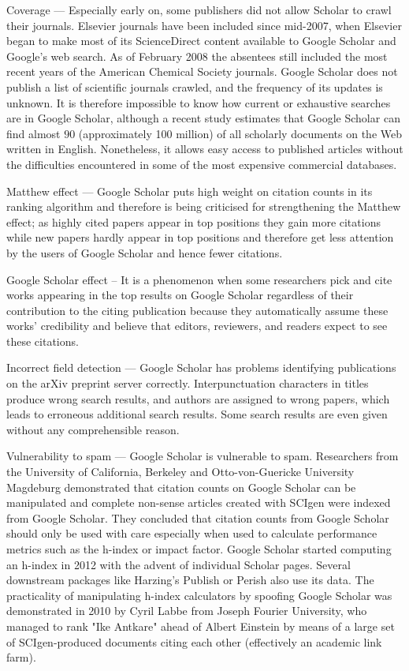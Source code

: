 \begin{enumerate}
	Coverage — Especially early on, some publishers did not allow Scholar to crawl their journals. Elsevier journals have been included since mid-2007, when Elsevier began to make most of its ScienceDirect content available to Google Scholar and Google's web search. As of February 2008 the absentees still included the most recent years of the American Chemical Society journals. Google Scholar does not publish a list of scientific journals crawled, and the frequency of its updates is unknown. It is therefore impossible to know how current or exhaustive searches are in Google Scholar, although a recent study estimates that Google Scholar can find almost $90$ (approximately 100 million) of all scholarly documents on the Web written in English. Nonetheless, it allows easy access to published articles without the difficulties encountered in some of the most expensive commercial databases.
	
	Matthew effect — Google Scholar puts high weight on citation counts in its ranking algorithm and therefore is being criticised for strengthening the Matthew effect; as highly cited papers appear in top positions they gain more citations while new papers hardly appear in top positions and therefore get less attention by the users of Google Scholar and hence fewer citations.
	
	Google Scholar effect – It is a phenomenon when some researchers pick and cite works appearing in the top results on Google Scholar regardless of their contribution to the citing publication because they automatically assume these works’ credibility and believe that editors, reviewers, and readers expect to see these citations.
	
	Incorrect field detection — Google Scholar has problems identifying publications on the arXiv preprint server correctly. Interpunctuation characters in titles produce wrong search results, and authors are assigned to wrong papers, which leads to erroneous additional search results. Some search results are even given without any comprehensible reason.
	
	Vulnerability to spam — Google Scholar is vulnerable to spam. Researchers from the University of California, Berkeley and Otto-von-Guericke University Magdeburg demonstrated that citation counts on Google Scholar can be manipulated and complete non-sense articles created with SCIgen were indexed from Google Scholar. They concluded that citation counts from Google Scholar should only be used with care especially when used to calculate performance metrics such as the h-index or impact factor. Google Scholar started computing an h-index in 2012 with the advent of individual Scholar pages. Several downstream packages like Harzing's Publish or Perish also use its data. The practicality of manipulating h-index calculators by spoofing Google Scholar was demonstrated in 2010 by Cyril Labbe from Joseph Fourier University, who managed to rank "Ike Antkare" ahead of Albert Einstein by means of a large set of SCIgen-produced documents citing each other (effectively an academic link farm).
	

\end{enumerate}
